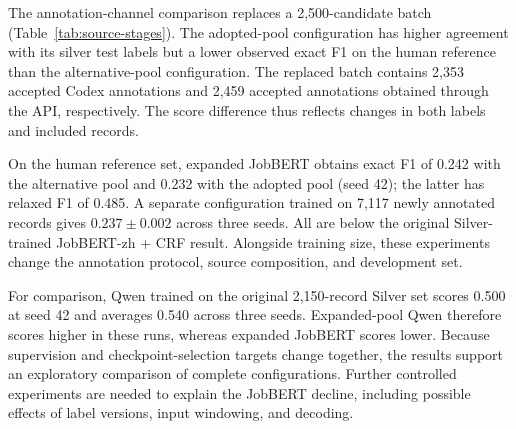 The annotation-channel comparison replaces a 2,500-candidate batch (Table~\ref{tab:source-stages}). The adopted-pool configuration has higher agreement with its silver test labels but a lower observed exact F1 on the human reference than the alternative-pool configuration. The replaced batch contains 2,353 accepted Codex annotations and 2,459 accepted annotations obtained through the API, respectively. The score difference thus reflects changes in both labels and included records.

On the human reference set, expanded JobBERT obtains exact F1 of 0.242 with the alternative pool and 0.232 with the adopted pool (seed 42); the latter has relaxed F1 of 0.485. A separate configuration trained on 7,117 newly annotated records gives $0.237\pm0.002$ across three seeds. All are below the original Silver-trained JobBERT-zh + CRF result. Alongside training size, these experiments change the annotation protocol, source composition, and development set.

For comparison, Qwen trained on the original 2,150-record Silver set scores 0.500 at seed 42 and averages 0.540 across three seeds. Expanded-pool Qwen therefore scores higher in these runs, whereas expanded JobBERT scores lower. Because supervision and checkpoint-selection targets change together, the results support an exploratory comparison of complete configurations. Further controlled experiments are needed to explain the JobBERT decline, including possible effects of label versions, input windowing, and decoding.
